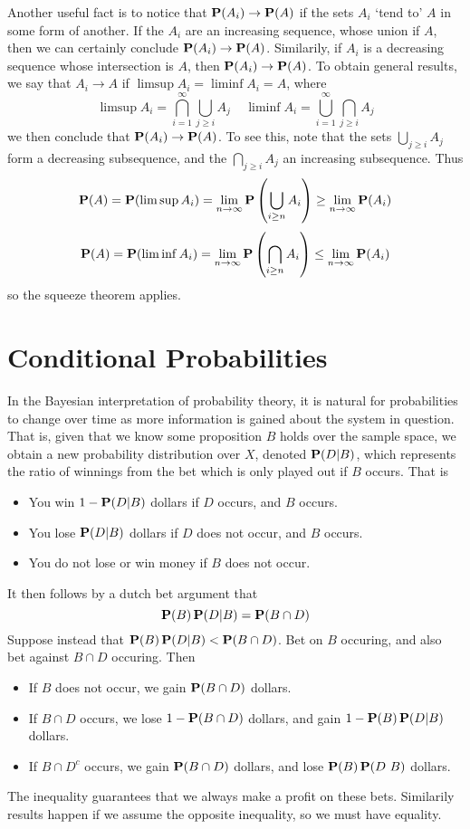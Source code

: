 Another useful fact is to notice that $\operatorname{\mathbf{P}}(A_i) \to \operatorname{\mathbf{P}}(A)$ if the sets $A_i$ `tend to' $A$ in some form of another. If the $A_i$ are an increasing sequence, whose union if $A$, then we can certainly conclude $\operatorname{\mathbf{P}}(A_i) \to \operatorname{\mathbf{P}}(A)$. Similarily, if $A_i$ is a decreasing sequence whose intersection is $A$, then $\operatorname{\mathbf{P}}(A_i) \to \operatorname{\mathbf{P}}(A)$. To obtain general results, we say that $A_i \to A$ if $\limsup A_i = \liminf A_i = A$, where
%
\[ \limsup A_i = \bigcap_{i = 1}^\infty \bigcup_{j \geq i} A_j\ \ \ \ \ \liminf A_i = \bigcup_{i = 1}^\infty \bigcap_{j \geq i} A_j \]
%
we then conclude that $\operatorname{\mathbf{P}}(A_i) \to \operatorname{\mathbf{P}}(A)$. To see this, note that the sets $\bigcup_{j \geq i} A_j$ form a decreasing subsequence, and the $\bigcap_{j \geq i} A_j$ an increasing subsequence. Thus
%
\[ \operatorname{\mathbf{P}}(A) = \operatorname{\mathbf{P}}(\limsup A_i) = \lim_{n \to \infty} \operatorname{\mathbf{P}} \left(\bigcup_{i \geq n} A_i \right) \geq \lim_{n \to \infty} \operatorname{\mathbf{P}}(A_i) \]
\[ \operatorname{\mathbf{P}}(A) = \operatorname{\mathbf{P}}(\liminf A_i) = \lim_{n \to \infty} \operatorname{\mathbf{P}} \left( \bigcap_{i \geq n} A_i \right) \leq \lim_{n \to \infty} \operatorname{\mathbf{P}}(A_i) \]
%
so the squeeze theorem applies.

\section{Conditional Probabilities}

In the Bayesian interpretation of probability theory, it is natural for probabilities to change over time as more information is gained about the system in question. That is, given that we know some proposition $B$ holds over the sample space, we obtain a new probability distribution over $X$, denoted $\operatorname{\mathbf{P}}(D | B)$, which represents the ratio of winnings from the bet which is only played out if $B$ occurs. That is
%
\begin{itemize}
    \item You win $1-\operatorname{\mathbf{P}}(D|B)$ dollars if $D$ occurs, and $B$ occurs.
    \item You lose $\operatorname{\mathbf{P}}(D|B)$ dollars if $D$ does not occur, and $B$ occurs.
    \item You do not lose or win money if $B$ does not occur.
\end{itemize}
%
It then follows by a dutch bet argument that
%
\[ \operatorname{\mathbf{P}}(B) \operatorname{\mathbf{P}}(D | B) = \operatorname{\mathbf{P}}(B \cap D) \]
%
Suppose instead  that $\operatorname{\mathbf{P}}(B) \operatorname{\mathbf{P}}(D|B) < \operatorname{\mathbf{P}}(B \cap D)$. Bet on $B$ occuring, and also bet against $B \cap D$ occuring. Then
%
\begin{itemize}
    \item If $B$ does not occur, we gain $\operatorname{\mathbf{P}}(B \cap D)$ dollars.
    \item If $B \cap D$ occurs, we lose $1 - \operatorname{\mathbf{P}}(B \cap D)$ dollars, and gain $1 - \operatorname{\mathbf{P}}(B) \operatorname{\mathbf{P}}(D | B)$ dollars.
    \item If $B \cap D^c$ occurs, we gain $\operatorname{\mathbf{P}}(B \cap D)$ dollars, and lose $\Prob(B) \Prob(D \ B)$ dollars.
\end{itemize}
%
The inequality guarantees that we always make a profit on these bets. Similarily results happen if we assume the opposite inequality, so we must have equality.

